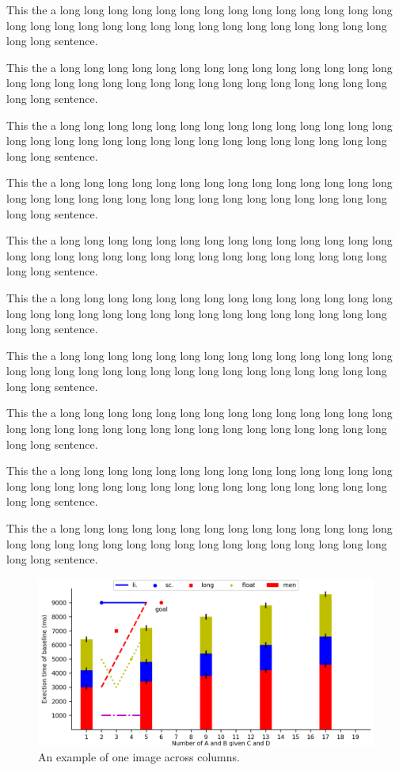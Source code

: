 \documentclass[letterpaper,twocolumn,10pt]{article}
\begin{document}
This the a long long long long long long long long long long long
 long long long long long long long long long long long long long
 long long long long long long long long sentence.

This the a long long long long long long long long long long long
 long long long long long long long long long long long long long
 long long long long long long long long sentence.

This the a long long long long long long long long long long long
 long long long long long long long long long long long long long
 long long long long long long long long sentence.

This the a long long long long long long long long long long long
 long long long long long long long long long long long long long
 long long long long long long long long sentence.

This the a long long long long long long long long long long long
 long long long long long long long long long long long long long
 long long long long long long long long sentence.

This the a long long long long long long long long long long long
 long long long long long long long long long long long long long
 long long long long long long long long sentence.

This the a long long long long long long long long long long long
 long long long long long long long long long long long long long
 long long long long long long long long sentence.

This the a long long long long long long long long long long long
 long long long long long long long long long long long long long
 long long long long long long long long sentence.

This the a long long long long long long long long long long long
 long long long long long long long long long long long long long
 long long long long long long long long sentence.


This the a long long long long long long long long long long long
 long long long long long long long long long long long long long
 long long long long long long long long sentence.

\begin{figure}[htb]
    \centering
    \includegraphics[width=0.96\linewidth]{SampleFig-6-4-inch.png}
    \caption{An example of one image across columns.}
\end{figure}
\end{document}
